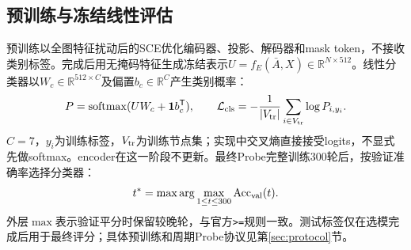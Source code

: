 \subsection{预训练与冻结线性评估}
预训练以全图特征扰动后的SCE优化编码器、投影、解码器和mask token，不接收类别标签。完成后用无掩码特征生成冻结表示$U=f_E(\bar A,X)\in\mathbb R^{N\times512}$。线性分类器以$W_c\in\mathbb R^{512\times C}$及偏置$b_c\in\mathbb R^C$产生类别概率：
\begin{equation}\label{eq:classifier}
P=\operatorname{softmax}(UW_c+\mathbf1 b_c^{\mathsf T}),\qquad
\mathcal L_{\rm cls}=-\frac1{|V_{\rm tr}|}\sum_{i\in V_{\rm tr}}\log P_{i,y_i}.
\end{equation}
$C=7$，$y_i$为训练标签，$V_{\rm tr}$为训练节点集；实现中交叉熵直接接受logits，不显式先做softmax。encoder在这一阶段不更新。最终Probe完整训练300轮后，按验证准确率选择分类器：
\begin{equation}\label{eq:probe-selection}
t^*=\max\arg\max_{1\le t\le300}\operatorname{Acc}_{\rm val}(t).
\end{equation}
外层$\max$表示验证平分时保留较晚轮，与官方\texttt{>=}规则一致。测试标签仅在选模完成后用于最终评分；具体预训练和周期Probe协议见第\ref{sec:protocol}节。
